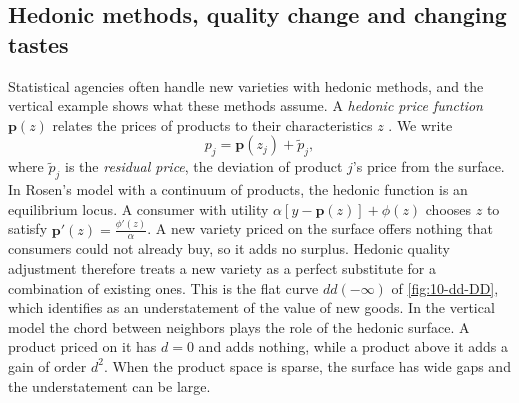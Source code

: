 \subsection{Hedonic methods, quality change and changing tastes}\label{sec:10-cs-hedonic}

Statistical agencies often handle new varieties with hedonic methods, and the vertical example shows what these
methods assume. A \emph{hedonic price function} $\mathbf{p}(z)$ relates the prices of products to their
characteristics $z$ \citep{Griliches1971,Rosen1974}. We write
\begin{equation}\label{eq:10-hedonic}
p_j = \mathbf{p}(z_j) + \tilde p_j ,
\end{equation}
where $\tilde p_j$ is the \emph{residual price}, the deviation of product $j$'s price from the surface. In Rosen's
model with a continuum of products, the hedonic function is an equilibrium locus. A consumer with utility
$\alpha[y - \mathbf{p}(z)] + \phi(z)$ chooses $z$ to satisfy $\mathbf{p}'(z) = \frac{\phi'(z)}{\alpha}$. A new
variety priced on the surface offers nothing that consumers could not already buy, so it adds no surplus. Hedonic
quality adjustment therefore treats a new variety as a perfect substitute for a combination of existing ones.
This is the flat curve $dd(-\infty)$ of \cref{fig:10-dd-DD}, which \citet[p.~238]{Bresnahan1997} identifies as an
understatement of the value of new goods. In the vertical model the chord between neighbors plays the role of the
hedonic surface. A product priced on it has $d = 0$ and adds nothing, while a product above it adds a gain of
order $d^2$. When the product space is sparse, the surface has wide gaps and the understatement can be large.

